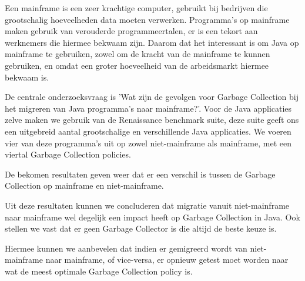Een mainframe is een zeer krachtige computer, gebruikt bij bedrijven die grootschalig hoeveelheden data moeten verwerken.
Programma's op mainframe maken gebruik van verouderde programmeertalen, er is een tekort aan werknemers die hiermee bekwaam zijn.
Daarom dat het interessant is om Java op mainframe te gebruiken, zowel om de kracht van de mainframe te kunnen gebruiken, en omdat een groter hoeveelheid van de arbeidsmarkt hiermee bekwaam is.

De centrale onderzoeksvraag is 'Wat zijn de gevolgen voor Garbage Collection bij het migreren van Java programma's naar mainframe?'.
Voor de Java applicaties zelve maken we gebruik van de Renaissance benchmark suite, deze suite geeft ons een uitgebreid aantal grootschalige en verschillende Java applicaties.
We voeren vier van deze programma's uit op zowel niet-mainframe als mainframe, met een viertal Garbage Collection policies.

De bekomen resultaten geven weer dat er een verschil is tussen de Garbage Collection op mainframe en niet-mainframe.


Uit deze resultaten kunnen we concluderen dat migratie vanuit niet-mainframe naar mainframe wel degelijk een impact heeft op Garbage Collection in Java.
Ook stellen we vast dat er geen Garbage Collector is die altijd de beste keuze is.


Hiermee kunnen we aanbevelen dat indien er gemigreerd wordt van niet-mainframe naar mainframe, of vice-versa, er opnieuw getest moet worden naar wat de meest optimale Garbage Collection policy is.




